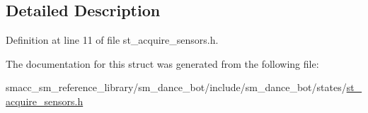 \subsection{Detailed Description}


Definition at line 11 of file st\+\_\+acquire\+\_\+sensors.\+h.



The documentation for this struct was generated from the following file\+:\begin{DoxyCompactItemize}
\item 
smacc\+\_\+sm\+\_\+reference\+\_\+library/sm\+\_\+dance\+\_\+bot/include/sm\+\_\+dance\+\_\+bot/states/\hyperlink{st__acquire__sensors_8h}{st\+\_\+acquire\+\_\+sensors.\+h}\end{DoxyCompactItemize}
